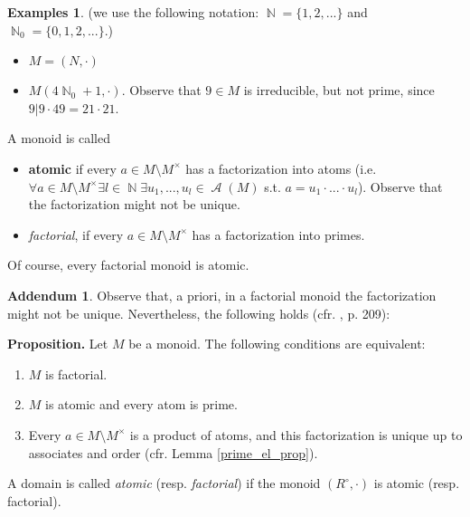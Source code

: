 \documentclass[12pt,a4paper]{report}
\theoremstyle{definition}
\newtheorem*{addendum}{Addendum}
\newtheorem*{examples}{Examples}
\theoremstyle{num.custom-title}
\DeclareMathOperator{\A}{\mathcal{A}}
\DeclareMathOperator{\N}{\mathbb{N}}
\DeclareMathOperator{\sm}{\setminus}
\begin{document}
\begin{examples} (we use the following notation: $\N=\{1,2,...\}$ and $\N_0 = \{0,1,2,...\}$.)
\begin{itemize}
\item $M=(N, \cdot)$
\item $M(4\N_0+1, \cdot)$. Observe that $9 \in M$ is irreducible, but not prime, since $9|9 \cdot 49 = 21 \cdot 21$.
\end{itemize}
\end{examples}

\noindent A monoid is called 
\begin{itemize}
\item \textbf{atomic} if every $a \in M \sm M^\times$ has a factorization into atoms (i.e. $\forall a \in M \sm M^\times \exists l \in \N \exists u_1,...,u_l \in \A(M)$ s.t. $a=u_1 \cdot ... \cdot u_l$). Observe that the factorization might not be unique.
\item \emph{factorial}, if every $a \in M \sm M^\times$ has a factorization into primes.
\end{itemize}

Of course, every factorial monoid is atomic.

\begin{addendum}
Observe that, a priori, in a factorial monoid the factorization might not be unique. Nevertheless, the following holds (cfr. \cite{Bre2006}, p. 209):

\textbf{Proposition.} Let $M$ be a monoid. The following conditions are equivalent:
\begin{enumerate}
\item $M$ is factorial.
\item $M$ is atomic and every atom is prime.
\item Every $a \in M \sm M^\times$ is a product of atoms, and this factorization is unique up to associates and order (cfr. Lemma \ref{prime_el_prop}).
\end{enumerate}
\end{addendum}

\noindent A domain is called \emph{atomic} (resp. \emph{factorial}) if the monoid $(R^\circ,\cdot)$ is atomic (resp. factorial).
\end{document}

